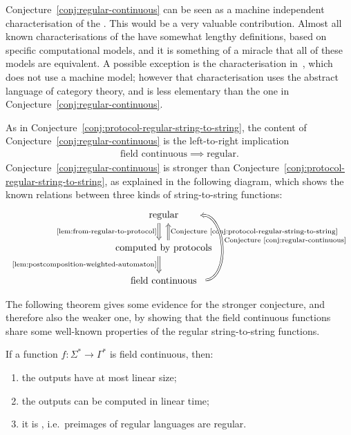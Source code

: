 Conjecture~\ref{conj:regular-continuous} can be seen as a machine independent
characterisation of the . This would be
a very valuable contribution. Almost all known characterisations of the
 have somewhat lengthy definitions,
based on specific computational models, and it is something of a miracle that
all of these models are equivalent. A possible exception is the
characterisation in~\cite{bojanczykTitoRegular23}, which does not use a machine
model; however that characterisation uses the abstract language of category
theory, and is less elementary than the one in
Conjecture~\ref{conj:regular-continuous}.

As in Conjecture~\ref{conj:protocol-regular-string-to-string}, the content of Conjecture~\ref{conj:regular-continuous} is the left-to-right implication
\begin{align*}
\text{field continuous} \implies \text{regular}.
\end{align*}
Conjecture~\ref{conj:regular-continuous} is stronger than Conjecture~\ref{conj:protocol-regular-string-to-string}, as explained in the following diagram, which shows the known relations between three kinds of string-to-string functions:
\[
\begin{tikzcd}
\text{~~~~regular~~~~}
\ar[d,Rightarrow,shift right=2, "\text{\cref{lem:from-regular-to-protocol}}"']
\\
\text{computed by protocols}
\ar[d,Rightarrow, shift right=2, "\text{\cref{lem:postcomposition-weighted-automaton}}"']
\ar[u,Rightarrow, shift right=2,"\text{Conjecture~\ref{conj:protocol-regular-string-to-string}}"']
\\ 
\text{field continuous} 
\ar[uu,bend right=89, Rightarrow, shift right=2,"\text{Conjecture~\ref{conj:regular-continuous}}"']
\end{tikzcd}
\]


The following theorem gives some evidence for the stronger conjecture,  and
therefore also the weaker one, by showing that the field continuous functions
share some well-known properties of the regular string-to-string functions. 

\begin{theorem}\label{thm:evidence-for-the-conjecture}
    If a function $f : \Sigma^* \to \Gamma^*$ is  field continuous, then:
    \begin{enumerate}
        \item \label{it:linear-size-outputs} the outputs have at most linear size;
        \item \label{it:linear-time-computable} the outputs can be computed in linear time;
        \item \label{it:regular-preimages} it is , i.e.~preimages of regular languages are regular.
    \end{enumerate}
\end{theorem}


